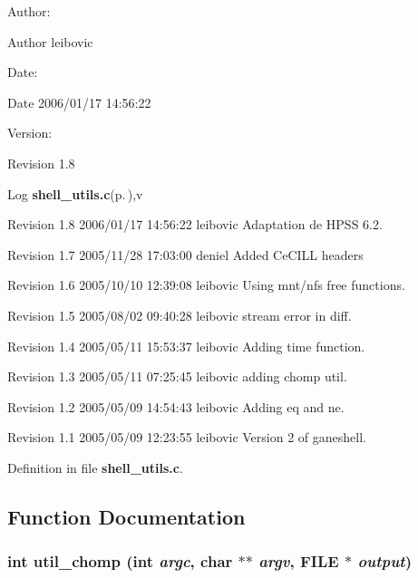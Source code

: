 \begin{Desc}
\item[Author:]\begin{Desc}
\item[Author]leibovic \end{Desc}
\end{Desc}
\begin{Desc}
\item[Date:]\begin{Desc}
\item[Date]2006/01/17 14:56:22 \end{Desc}
\end{Desc}
\begin{Desc}
\item[Version:]\begin{Desc}
\item[Revision]1.8 \end{Desc}
\end{Desc}
\begin{Desc}
\item[Log]{\bf shell\_\-utils.c}{\rm (p.\,\pageref{shell__utils_8c})},v \end{Desc}
Revision 1.8 2006/01/17 14:56:22 leibovic Adaptation de HPSS 6.2.

Revision 1.7 2005/11/28 17:03:00 deniel Added Ce\-CILL headers

Revision 1.6 2005/10/10 12:39:08 leibovic Using mnt/nfs free functions.

Revision 1.5 2005/08/02 09:40:28 leibovic stream error in diff.

Revision 1.4 2005/05/11 15:53:37 leibovic Adding time function.

Revision 1.3 2005/05/11 07:25:45 leibovic adding chomp util.

Revision 1.2 2005/05/09 14:54:43 leibovic Adding eq and ne.

Revision 1.1 2005/05/09 12:23:55 leibovic Version 2 of ganeshell.

Definition in file {\bf shell\_\-utils.c}.

\subsection{Function Documentation}
\subsubsection{\setlength{\rightskip}{0pt plus 5cm}int util\_\-chomp (int {\em argc}, char $\ast$$\ast$ {\em argv}, FILE $\ast$ {\em output})}\label{shell__utils_8c_a12}




